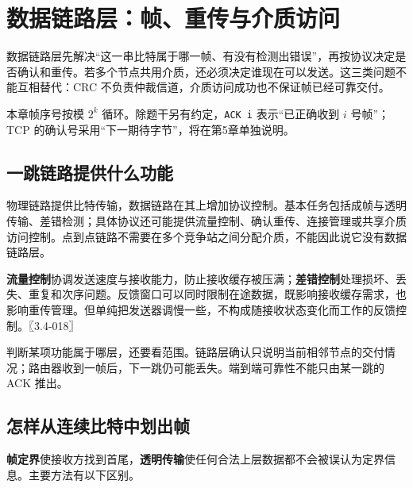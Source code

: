 \chapter{数据链路层：帧、重传与介质访问}\label{cn-ch3}

数据链路层先解决``这一串比特属于哪一帧、有没有检测出错误''，再按协议决定是否确认和重传。若多个节点共用介质，还必须决定谁现在可以发送。这三类问题不能互相替代：CRC 不负责仲裁信道，介质访问成功也不保证帧已经可靠交付。

本章帧序号按模 \(2^k\) 循环。除题干另有约定，\allowbreak{}\texttt{ACK\ i} 表示``已正确收到 \(i\) 号帧''；TCP 的确认号采用``下一期待字节''，将在第5章单独说明。

\section{一跳链路提供什么功能}\label{cn-03-01}

物理链路提供比特传输，数据链路在其上增加协议控制。基本任务包括成帧与透明传输、差错检测；具体协议还可能提供流量控制、确认重传、连接管理或共享介质访问控制。点到点链路不需要在多个竞争站之间分配介质，不能因此说它没有数据链路层。

\textbf{流量控制}协调发送速度与接收能力，防止接收缓存被压满；\textbf{差错控制}处理损坏、丢失、重复和次序问题。反馈窗口可以同时限制在途数据，既影响接收缓存需求，也影响重传管理。但单纯把发送器调慢一些，不构成随接收状态变化而工作的反馈控制。〖3.4-018〗

判断某项功能属于哪层，还要看范围。链路层确认只说明当前相邻节点的交付情况；路由器收到一帧后，下一跳仍可能丢失。端到端可靠性不能只由某一跳的 ACK 推出。

\section{怎样从连续比特中划出帧}\label{cn-03-02}

\textbf{帧定界}使接收方找到首尾，\textbf{透明传输}使任何合法上层数据都不会被误认为定界信息。主要方法有以下区别。

